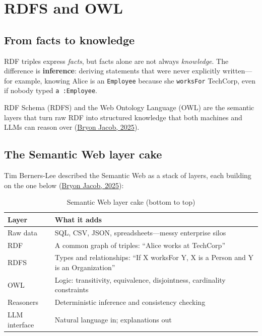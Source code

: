 \section{RDFS and OWL}

\subsection{From facts to knowledge}

RDF triples express \emph{facts}, but facts alone are not always \emph{knowledge}.
The difference is \textbf{inference}: deriving statements that were never explicitly
written---for example, knowing Alice is an \texttt{Employee} because she
\texttt{worksFor} TechCorp, even if nobody typed \texttt{a :Employee}.

RDF Schema (RDFS) and the Web Ontology Language (OWL) are the semantic layers that
turn raw RDF into structured knowledge that both machines and LLMs can reason over
(\href{https://bryon.io/from-facts-to-knowledge-the-layer-cake-of-rdfs-and-owl-e84819d8075d}{Bryon Jacob, 2025}).

\subsection{The Semantic Web layer cake}

Tim Berners-Lee described the Semantic Web as a stack of layers, each building on
the one below
(\href{https://bryon.io/from-facts-to-knowledge-the-layer-cake-of-rdfs-and-owl-e84819d8075d}{Bryon Jacob, 2025}):

\begin{table}[htbp]
  \centering
  \small
  \caption{Semantic Web layer cake (bottom to top)}
  \label{tab:layer-cake}
  \renewcommand{\arraystretch}{1.2}
  \begin{tabularx}{\textwidth}{@{}l X@{}}
    \toprule
    \textbf{Layer} & \textbf{What it adds} \\
    \midrule
    Raw data & SQL, CSV, JSON, spreadsheets---messy enterprise silos \\
    RDF & A common graph of triples: ``Alice works at TechCorp'' \\
    RDFS & Types and relationships: ``If X worksFor Y, X is a Person and Y is an Organization'' \\
    OWL & Logic: transitivity, equivalence, disjointness, cardinality constraints \\
    Reasoners & Deterministic inference and consistency checking \\
    LLM interface & Natural language in; explanations out \\
    \bottomrule
  \end{tabularx}
\end{table}

